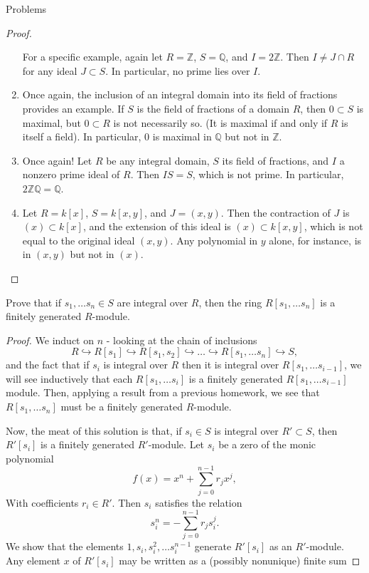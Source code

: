 \documentclass[12pt]{article}
\newcommand{\Q}{\mathbb{Q}}
\newcommand{\Z}{\mathbb{Z}}
\theoremstyle{definition}
\newenvironment{problem}[2][Problem]{\begin{trivlist}
\item[\hskip \labelsep {\bfseries #1}\hskip \labelsep {\bfseries #2.}]}{\end{trivlist}}
\begin{document}
\begin{section}{Problems}
\begin{proof}
\begin{enumerate}[label=(\alph*)]
    \par For a specific example, again let $R = \Z$, $S = \Q$, and $I = 2\Z$. Then $I \neq J \cap R$ for any ideal $J \subset S$. In particular, no prime lies over $I$.
    \item Once again, the inclusion of an integral domain into its field of fractions provides an example. If $S$ is the field of fractions of a domain $R$, then $0 \subset S$ is maximal, but $0 \subset R$ is not necessarily so. (It is maximal if and only if $R$ is itself a field). In particular, $0$ is maximal in $\Q$ but not in $\Z$.
    \item Once again! Let $R$ be any integral domain, $S$ its field of fractions, and $I$ a nonzero prime ideal of $R$. Then $IS = S$, which is not prime. In particular, $2\Z\Q = \Q$.
    \item Let $R = k[x]$, $S = k[x,y]$, and $J = (x,y)$. Then the contraction of $J$ is $(x) \subset k[x]$, and the extension of this ideal is $(x) \subset k[x,y]$, which is not equal to the original ideal $(x,y)$. Any polynomial in $y$ alone, for instance, is in $(x,y)$ but not in $(x)$.
\end{enumerate}
\end{proof}
\begin{problem}{2}
	Prove that if $s_1, \dots s_n \in S$ are integral over $R$, then the ring $R[s_1, \dots s_n]$ is a finitely generated $R$-module.
\end{problem}
\begin{proof}
	We induct on $n$ - looking at the chain of inclusions
	\[R \hookrightarrow R[s_1] \hookrightarrow R[s_1, s_2] \hookrightarrow \dots \hookrightarrow R[s_1, \dots s_n] \hookrightarrow S,\]
	and the fact that if $s_i$ is integral over $R$ then it is integral over $R[s_1, \dots s_{i-1}]$, we will see inductively that each $R[s_1, \dots s_i]$ is a finitely generated $R[s_1, \dots s_{i-1}]$ module. Then, applying a result from a previous homework, we see that $R[s_1, \dots s_n]$ must be a finitely generated $R$-module.
	\par Now, the meat of this solution is that, if $s_i \in S$ is integral over $R' \subset S$, then $R'[s_i]$ is a finitely generated $R'$-module. Let $s_i$ be a zero of the monic polynomial 
	\[f(x) = x^n + \sum_{j= 0}^{n-1}r_jx^j,\]
	With coefficients $r_i \in R'$. Then $s_i$ satisfies the relation 
	\[s_i^n = -\sum_{j=0}^{n-1}r_js_i^j.\]
	We show that the elements $1, s_i, s_i^2, \dots s_i^{n-1}$ generate $R'[s_i]$ as an $R'$-module. Any element $x$ of $R'[s_i]$ may be written as a (possibly nonunique) finite sum

\end{proof}
\end{section}
\end{document}
